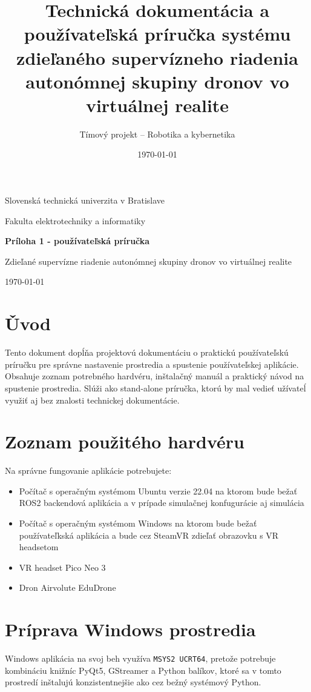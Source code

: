 \documentclass[a4paper,12pt]{article}
\title{\textbf{Technická dokumentácia a používateľská príručka systému zdieľaného supervízneho riadenia autonómnej skupiny dronov vo virtuálnej realite}}
\author{Tímový projekt -- Robotika a kybernetika}
\date{\today}
\begin{document}
\begin{titlepage}
    \centering
    \vspace*{2.2cm}
    {\Large Slovenská technická univerzita v Bratislave\par}
    {\large Fakulta elektrotechniky a informatiky\par}
    \vspace{1.7cm}
    {\Huge\bfseries Príloha 1 - používateľská príručka\par}
    \vspace{0.5cm}
    {\LARGE Zdieľané supervízne riadenie autonómnej skupiny dronov vo virtuálnej realite\par}
    \vspace{1.8cm}
    \vfill
    {\large \today\par}
\end{titlepage}

\tableofcontents
\newpage



\section{Ǔvod}

Tento dokument dopĺňa projektovú dokumentáciu o praktickú používateľskú príručku pre správne nastavenie prostredia a spustenie používateľskej aplikácie. Obsahuje zoznam potrebného hardvéru, inštalačný manuál a praktický návod na spustenie prostredia. Slúži ako stand-alone príručka, ktorú by mal vedieť užívateĺ využiť aj bez znalosti technickej dokumentácie.

\section{Zoznam použitého hardvéru}

Na správne fungovanie aplikácie potrebujete:
\begin{itemize}
    \item Počítač s operačným systémom Ubuntu verzie 22.04 na ktorom bude bežať ROS2 backendová aplikácia a v prípade simulačnej konfugurácie aj simulácia
    \item Počítač s operačným systémom Windows na ktorom bude bežať používateľkská aplikácia a bude cez SteamVR zdieľať obrazovku s VR headsetom
    \item VR headset Pico Neo 3
    \item Dron Airvolute EduDrone 
\end{itemize}


\section{Príprava Windows prostredia}
Windows aplikácia na svoj beh využíva \texttt{MSYS2 UCRT64}, pretože potrebuje kombináciu knižníc PyQt5, GStreamer a Python balíkov, ktoré sa v tomto prostredí inštalujú konzistentnejšie ako cez bežný systémový Python.
\end{document}
